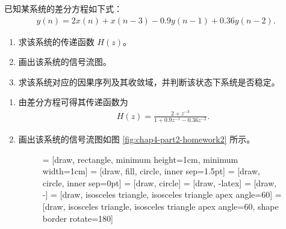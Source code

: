 \begin{homework}
    已知某系统的差分方程如下式：
    \begin{align*}
        y(n) = 2x(n) + x(n - 3) - 0.9y(n - 1) + 0.36y(n - 2).
    \end{align*}
    \begin{enumerate}[label=(\arabic*)]
        \item 求该系统的传递函数 $H(z)$。
        \item 画出该系统的信号流图。
        \item 求该系统对应的因果序列及其收敛域，并判断该状态下系统是否稳定。
    \end{enumerate}
\end{homework}

\begin{solution}
    \begin{enumerate}[label=(\arabic*)]
        \item 由差分方程可得其传递函数为
            \begin{align*}
                H(z) = \frac{2 + z^{-3}}{1 + 0.9z^{-1} - 0.36z^{-2}}.
            \end{align*}
        \item 画出该系统的信号流图如图 \ref{fig:chap4-part2-homework2} 所示。
            \begin{figure}[H]
                \centering
                 = [draw, rectangle, minimum height=1cm, minimum width=1cm]
                 = [draw, fill, circle, inner sep=1.5pt]
                 = [draw, circle, inner sep=0pt]
                 = [draw, circle]
                 = [draw, -latex]
                 = [draw, -]
                 = [draw, isosceles triangle, isosceles triangle apex angle=60]
                 = [draw, isosceles triangle, isosceles triangle apex angle=60, shape border rotate=180]
\end{figure}
\end{enumerate}
\end{solution}
